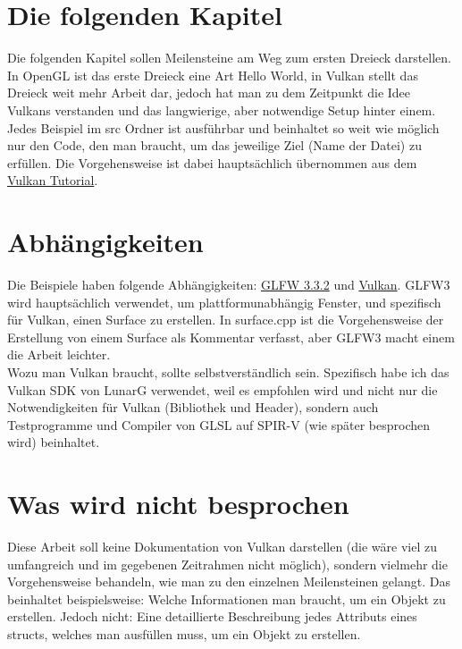\documentclass[11pt,a4paper]{report}
\begin{document}
\section{Die folgenden Kapitel}
Die folgenden Kapitel sollen Meilensteine am Weg zum ersten Dreieck darstellen. In OpenGL ist das erste Dreieck eine Art Hello World, in Vulkan stellt das Dreieck weit mehr Arbeit dar, jedoch hat man zu dem Zeitpunkt die Idee Vulkans verstanden und das langwierige, aber notwendige Setup hinter einem.\\
Jedes Beispiel im src Ordner ist ausführbar und beinhaltet so weit wie möglich nur den Code, den man braucht, um das jeweilige Ziel (Name der Datei) zu erfüllen. Die Vorgehensweise ist dabei hauptsächlich übernommen aus dem \href{https://vulkan-tutorial.com}{Vulkan Tutorial}.

\section{Abhängigkeiten}
Die Beispiele haben folgende Abhängigkeiten: \href{https://www.glfw.org/download.html}{GLFW 3.3.2} und \href{https://vulkan.lunarg.com}{Vulkan}. GLFW3 wird hauptsächlich verwendet, um plattformunabhängig Fenster, und spezifisch für Vulkan, einen Surface zu erstellen. In surface.cpp ist die Vorgehensweise der Erstellung von einem Surface als Kommentar verfasst, aber GLFW3 macht einem die Arbeit leichter.\\
Wozu man Vulkan braucht, sollte selbstverständlich sein. Spezifisch habe ich das Vulkan SDK von LunarG verwendet, weil es empfohlen wird und nicht nur die Notwendigkeiten für Vulkan (Bibliothek und Header), sondern auch Testprogramme und Compiler von GLSL auf SPIR-V (wie später besprochen wird) beinhaltet.

\section{Was wird nicht besprochen}
Diese Arbeit soll keine Dokumentation von Vulkan darstellen (die wäre viel zu umfangreich und im gegebenen Zeitrahmen nicht möglich), sondern vielmehr die Vorgehensweise behandeln, wie man zu den einzelnen Meilensteinen gelangt. Das beinhaltet beispielsweise: Welche Informationen man braucht, um ein Objekt zu erstellen. Jedoch nicht: Eine detaillierte Beschreibung jedes Attributs eines structs, welches man ausfüllen muss, um ein Objekt zu erstellen.
\end{document}
